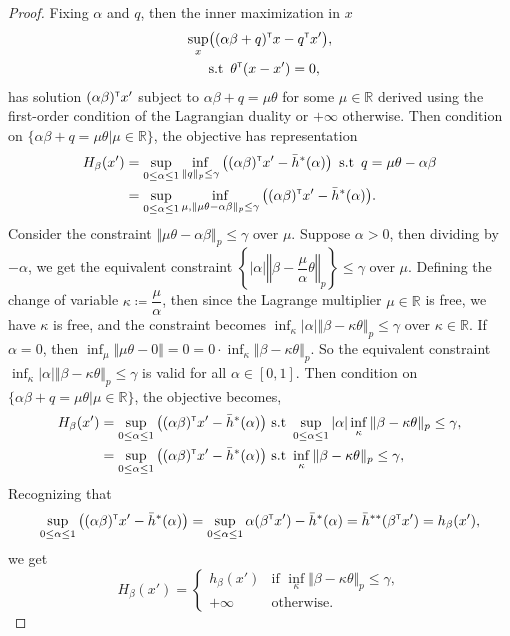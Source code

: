 \documentclass[12pt]{article}
\begin{document}
\begin{proof}
    Fixing $\alpha$ and $q$, then the inner maximization in $x$
    \begin{align*}
       \sup_x &\big( (\alpha \beta + q)^{\scriptscriptstyle \sf T} x  -q^{\scriptscriptstyle \sf T} x'\big),\\
        &\text{s.t} \,\,\, \theta^{\scriptscriptstyle \sf T}(x-x') = 0,
    \end{align*}
    has solution $(\alpha \beta)^{\scriptscriptstyle \sf T} x'$ subject to $\alpha \beta + q = \mu\theta$ for some $\mu\in \mathbb{R}$ derived using the first-order condition of the Lagrangian duality or $+\infty$ otherwise. Then condition on $\{\alpha \beta + q = \mu\theta|\mu\in\mathbb{R}\}$, the objective has representation \begin{align*}
        H_\beta(x') &= \sup_{0\leq \alpha \leq 1} \inf_{\Vert q\Vert_p\leq \gamma} \big((\alpha \beta)^{\scriptscriptstyle \sf T} x' - \bar{h}^*(\alpha) \big) \,\,\, \text{s.t}\,\,\,q = \mu\theta - \alpha \beta \\
        &=\sup_{0\leq \alpha\leq 1}\inf_{\mu,\Vert \mu\theta - \alpha \beta \Vert_p\leq \gamma} \big((\alpha \beta)^{\scriptscriptstyle \sf T} x' - \bar{h}^*(\alpha) \big).
    \end{align*}
    Consider the constraint $\Vert \mu\theta - \alpha \beta \Vert_p\leq \gamma$ over $\mu$. Suppose $\alpha > 0$, then dividing by $-\alpha$, we get the equivalent constraint $\left\{|\alpha|\left\Vert \beta - \dfrac{\mu}{\alpha}\theta\right\Vert_p\right\} \leq \gamma$ over $\mu$. Defining the change of variable $\kappa \coloneqq \dfrac{\mu}{\alpha}$, then since the Lagrange multiplier $\mu \in \mathbb{R}$ is free, we have $\kappa$ is free, and the constraint becomes $ \inf_\kappa|\alpha|\Vert \beta - \kappa \theta\Vert_p \leq \gamma$ over $\kappa \in \mathbb{R}$. If $\alpha = 0$, then $\inf_\mu \Vert\mu\theta - 0\Vert = 0 = 0\cdot \inf_{\kappa}\Vert \beta - \kappa \theta\Vert_p$. So the equivalent constraint $\inf_\kappa |\alpha| \Vert \beta -\kappa \theta\Vert_p\leq \gamma$ is valid for all $\alpha \in [0,1]$. Then condition on $\{\alpha \beta + q = \mu\theta|\mu\in\mathbb{R}\}$, the objective becomes, \begin{align*}
        H_\beta(x') &= \sup_{0\leq \alpha\leq 1}\big((\alpha\beta)^{\scriptscriptstyle \sf T} x' - \bar{h}^*(\alpha)\big) \text{ s.t } \sup_{0\leq \alpha\leq 1}|\alpha| \inf_\kappa \Vert\beta-\kappa \theta\Vert_p \leq \gamma,\\
        & = \sup_{0\leq \alpha\leq 1}\big((\alpha\beta)^{\scriptscriptstyle \sf T} x' - \bar{h}^*(\alpha)\big) \text{ s.t } \inf_\kappa \Vert\beta-\kappa \theta\Vert_p \leq \gamma,
    \end{align*}
    Recognizing that \[\sup_{0\leq \alpha\leq 1}\big((\alpha \beta)^{\scriptscriptstyle \sf T} x' - \bar{h}^*(\alpha)\big) = \sup_{0\leq \alpha\leq 1} \alpha(\beta^{\scriptscriptstyle \sf T} x') - \bar{h}^*(\alpha) = \bar{h}^{**}(\beta^{\scriptscriptstyle \sf T} x') = h_\beta(x'),\]we get\[
     H_{\beta}(x')=
    \begin{cases}
        h_\beta(x') & \text{if }\inf_\kappa \Vert \beta-\kappa\theta\Vert_p\leq \gamma,\\
        +\infty &\text{otherwise.}
    \end{cases}
    \]
\end{proof}
\end{document}
